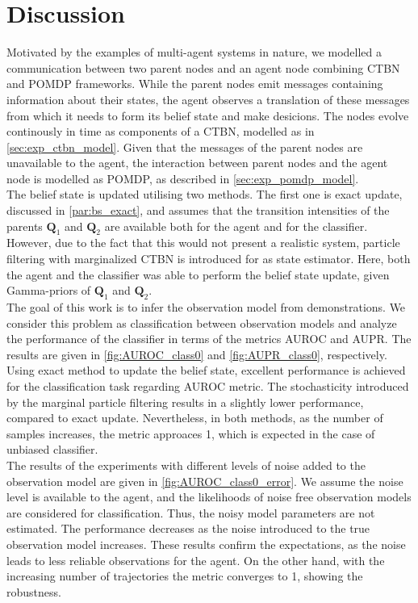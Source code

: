 \chapter{Discussion}
\label{chap:5}
Motivated by the examples of multi-agent systems in nature, we modelled a communication between two parent nodes and an agent node combining CTBN and POMDP frameworks. While the parent nodes emit messages containing information about their states, the agent observes a translation of these messages from which it needs to form its belief state and make desicions. The nodes evolve continously in time as components of a CTBN, modelled as in \cref{sec:exp_ctbn_model}. Given that the messages of the parent nodes are unavailable to the agent, the interaction between parent nodes and the agent node is modelled as POMDP, as described in \cref{sec:exp_pomdp_model}.\\
The belief state is updated utilising two methods. The first one is exact update, discussed in \cref{par:bs_exact}, and assumes that the transition intensities of the parents $ \textbf{Q}_1 $ and $ \textbf{Q}_2 $ are available both for the agent and for the classifier. However, due to the fact that this would not present a realistic system, particle filtering with marginalized CTBN is introduced for as state estimator. Here, both the agent and the classifier was able to perform the belief state update, given Gamma-priors of $ \textbf{Q}_1 $ and $ \textbf{Q}_2 $.\\
The goal of this work is to infer the observation model from demonstrations. We consider this problem as classification between observation models and analyze the performance of the classifier in terms of the metrics AUROC and AUPR. The results are given in \autoref{fig:AUROC_class0} and \autoref{fig:AUPR_class0}, respectively. Using exact method to update the belief state, excellent performance is achieved for the classification task regarding AUROC metric. The stochasticity introduced by the marginal particle filtering results in a slightly lower performance, compared to exact update. Nevertheless, in both methods, as the number of samples increases, the metric approaces 1, which is expected in the case of unbiased classifier.\\
The results of the experiments with different levels of noise added to the observation model are given in \autoref{fig:AUROC_class0_error}. We assume the noise level is available to the agent, and the likelihoods of noise free observation models are considered for classification. Thus, the noisy model parameters are not estimated. The performance decreases as the noise introduced to the true observation model increases. These results confirm the expectations, as the noise leads to less reliable observations for the agent. On the other hand, with the increasing number of trajectories the metric converges to 1, showing the robustness.\\
